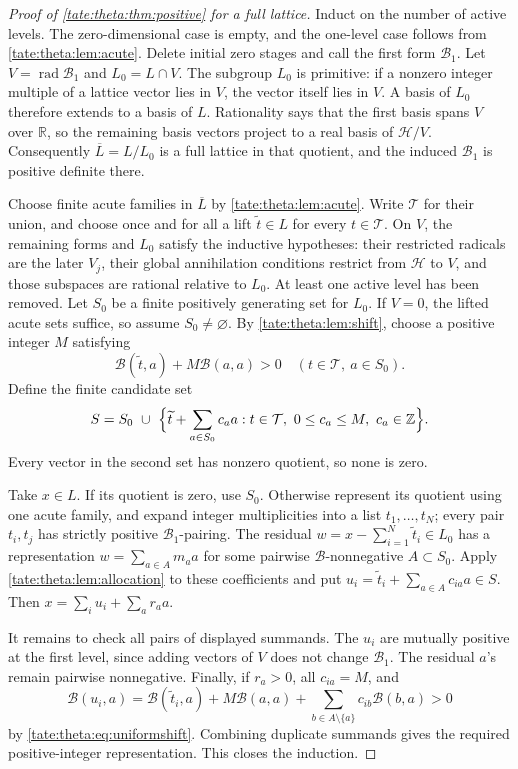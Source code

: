 \documentclass[11pt,letterpaper]{article}
\theoremstyle{definition}
\newcommand{\R}{\mathbb R}
\newcommand{\Z}{\mathbb Z}
\newcommand{\rad}{\operatorname{rad}}
\newcommand{\cB}{\mathcal B}
\newcommand{\cH}{\mathcal H}
\newcommand{\cT}{\mathcal T}
\begin{document}
\begin{proof}[Proof of \cref{tate:theta:thm:positive} for a full lattice]
Induct on the number of active levels. The zero-dimensional case is empty,
and the one-level case follows from \cref{tate:theta:lem:acute}. Delete
initial zero stages and call the first form $\cB_1$. Let $V=\rad\cB_1$ and
$L_0=L\cap V$. The subgroup $L_0$ is primitive: if a nonzero integer
multiple of a lattice vector lies in $V$, the vector itself lies in $V$.
A basis of $L_0$ therefore extends to a basis of $L$.
Rationality says that the first basis spans $V$ over $\R$, so the
remaining basis vectors project to a real basis of $\cH/V$.
Consequently $\overline L=L/L_0$ is a full lattice in that quotient,
and the induced $\cB_1$ is positive definite there.

Choose finite acute families in $\overline L$ by
\cref{tate:theta:lem:acute}. Write $\cT$ for their union, and choose once
and for all a lift $\widetilde t\in L$ for every $t\in\cT$. On $V$, the
remaining forms and $L_0$ satisfy the inductive hypotheses: their
restricted radicals are the later $V_j$, their global annihilation
conditions restrict from $\cH$ to $V$, and those subspaces are rational
relative to $L_0$. At least one active level has been removed.
Let $S_0$ be a finite positively generating set for $L_0$. If $V=0$, the lifted acute sets
suffice, so assume $S_0\ne\varnothing$. By \cref{tate:theta:lem:shift},
choose a positive integer $M$ satisfying
\begin{equation}
 \cB(\widetilde t,a)+M\cB(a,a)>0
 \quad(t\in\cT,\ a\in S_0).\label{tate:theta:eq:uniformshift}
\end{equation}
Define the finite candidate set
\begin{equation}
 S=S_0\ \cup\
 \Bigl\{\widetilde t+\sum_{a\in S_0}c_aa:
          t\in\cT,\ 0\le c_a\le M,\ c_a\in\Z\Bigr\}.
 \label{tate:theta:eq:constructedS}
\end{equation}
Every vector in the second set has nonzero quotient, so none is zero.

Take $x\in L$. If its quotient is zero, use $S_0$. Otherwise represent its
quotient using one acute family, and expand integer multiplicities into a
list $t_1,\ldots,t_N$; every pair $t_i,t_j$ has strictly positive
$\cB_1$-pairing. The residual $w=x-\sum_{i=1}^N\widetilde t_i\in L_0$ has
a representation $w=\sum_{a\in A}m_aa$ for some pairwise $\cB$-nonnegative
$A\subset S_0$. Apply \cref{tate:theta:lem:allocation} to these
coefficients and put $u_i=\widetilde t_i+\sum_{a\in A}c_{ia}a\in S$. Then
$x=\sum_iu_i+\sum_ar_aa$.

It remains to check all pairs of displayed summands. The $u_i$ are mutually
positive at the first level, since adding vectors of $V$ does not change
$\cB_1$. The residual $a$'s remain pairwise nonnegative. Finally, if
$r_a>0$, all $c_{ia}=M$, and
\[
 \cB(u_i,a)=\cB(\widetilde t_i,a)+M\cB(a,a)
       +\sum_{b\in A\setminus\{a\}}c_{ib}\cB(b,a)>0
\]
by \eqref{tate:theta:eq:uniformshift}. Combining duplicate summands gives
the required positive-integer representation. This closes the induction.
\end{proof}
\end{document}
